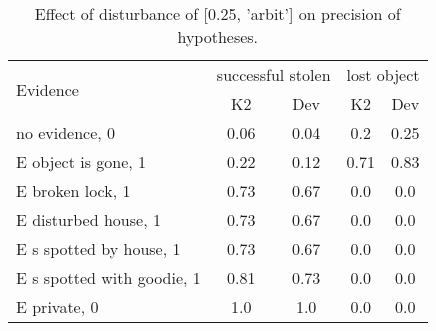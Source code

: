 \begin{table}\begin{tabular}{l|cc|cc}\toprule\multirow{2}{*}{Evidence} & \multicolumn{2}{c}{successful stolen}& \multicolumn{2}{c}{lost object}\\& {K2} & {Dev}& {K2} & {Dev}\\\midrule
no evidence, 0 & 0.06&0.04&0.2&0.25\\E object is gone, 1 & \cellcolor{Bittersweet}0.22&\cellcolor{Bittersweet}0.12&\cellcolor{Bittersweet}0.71&\cellcolor{Bittersweet}0.83\\E broken lock, 1 & \cellcolor{Bittersweet}0.73&\cellcolor{Bittersweet}0.67&0.0&0.0\\E disturbed house, 1 & \cellcolor{Bittersweet}0.73&\cellcolor{Bittersweet}0.67&0.0&0.0\\E s spotted by house, 1 & \cellcolor{Bittersweet}0.73&\cellcolor{Bittersweet}0.67&0.0&0.0\\E s spotted with goodie, 1 & \cellcolor{Bittersweet}0.81&\cellcolor{Bittersweet}0.73&0.0&0.0\\E private, 0 & 1.0&1.0&0.0&0.0\\\bottomrule\end{tabular}\caption{Effect of disturbance of [0.25, 'arbit'] on precision of hypotheses.}\end{table}